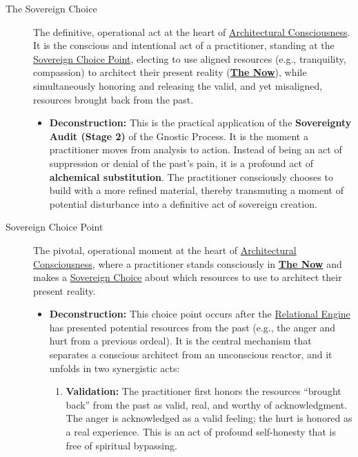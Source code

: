\documentclass{article}
\begin{document}
\begin{description}
    \item[\hypertarget{gloss:sovereign_choice}{The Sovereign Choice}] 
    The definitive, operational act at the heart of \hyperlink{gloss:architectural_consciousness}{Architectural Consciousness}. It is the conscious and intentional act of a practitioner, standing at the \hyperlink{gloss:sovereign_choice_point}{Sovereign Choice Point}, electing to use aligned resources (e.g., tranquility, compassion) to architect their present reality (\textbf{\hyperlink{gloss:the_now}{The Now}}), while simultaneously honoring and releasing the valid, and yet misaligned, resources brought back from the past.
    \begin{itemize}
        \item \textbf{Deconstruction:} This is the practical application of the \textbf{Sovereignty Audit (Stage 2)} of the Gnostic Process. It is the moment a practitioner moves from analysis to action. Instead of being an act of suppression or denial of the past's pain, it is a profound act of \textbf{alchemical substitution}. The practitioner consciously chooses to build with a more refined material, thereby transmuting a moment of potential disturbance into a definitive act of sovereign creation.
    \end{itemize}

    \item[\hypertarget{gloss:sovereign_choice_point}{Sovereign Choice Point}] 
    The pivotal, operational moment at the heart of \hyperlink{gloss:architectural_consciousness}{Architectural Consciousness}, where a practitioner stands consciously in \textbf{\hyperlink{gloss:the_now}{The Now}} and makes a \hyperlink{gloss:sovereign_choice}{Sovereign Choice} about which resources to use to architect their present reality.
    \begin{itemize}
        \item \textbf{Deconstruction:} This choice point occurs after the \hyperlink{gloss:relational_engine}{Relational Engine} has presented potential resources from the past (e.g., the anger and hurt from a previous ordeal). It is the central mechanism that separates a conscious architect from an unconscious reactor, and it unfolds in two synergistic acts:
        \begin{enumerate}
            \item \textbf{Validation:} The practitioner first honors the resources ``brought back'' from the past as valid, real, and worthy of acknowledgment. The anger is acknowledged as a valid feeling; the hurt is honored as a real experience. This is an act of profound self-honesty that is free of spiritual bypassing.
            

\end{enumerate}
\end{itemize}
\end{description}
\end{document}
